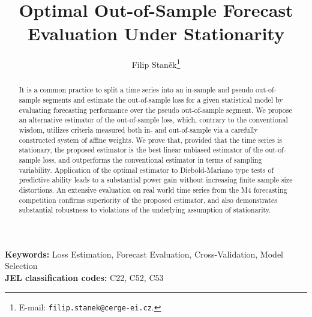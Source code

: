 \documentclass[11pt,dvipsnames]{article}
\begin{document}
\title{
\Large{Optimal Out-of-Sample Forecast Evaluation Under Stationarity}}
\author{
  Filip Stan\v{e}k\thanks{
  E-mail: \texttt{filip.stanek@cerge-ei.cz}.
}
}



\maketitle
\begin{abstract}
It is a common practice to split a time series into an in-sample and pseudo out-of-sample segments and estimate the out-of-sample loss for a given statistical model by evaluating forecasting performance over the pseudo out-of-sample segment. We propose an alternative estimator of the out-of-sample loss, which, contrary to the conventional wisdom, utilizes criteria measured both in- and out-of-sample via a carefully constructed system of affine weights. We prove that, provided that the time series is stationary, the proposed estimator is the best linear unbiased estimator of the out-of-sample loss, and outperforms the conventional estimator in terms of sampling variability. Application of the optimal estimator to Diebold-Mariano type tests of predictive ability leads to a substantial power gain without increasing finite sample size distortions. An extensive evaluation on real world time series from the M4 forecasting competition confirms superiority of the proposed estimator, and also demonstrates substantial robustness to violations of the underlying assumption of stationarity.
\end{abstract}
\bigskip 
\bigskip 
\bigskip 
\textbf{Keywords:} Loss Estimation, Forecast Evaluation, Cross-Validation, Model Selection\\
\textbf{JEL classification codes:} C22, C52, C53
\thispagestyle{empty}
\newpage 
\end{document}
